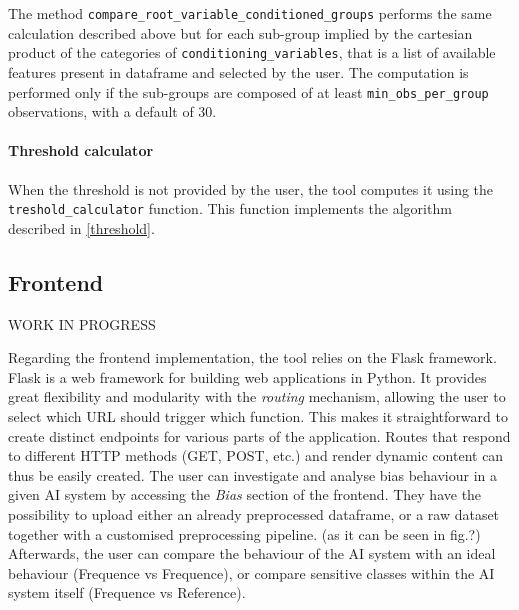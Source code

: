 \documentclass[
]{ceurart}
\begin{document}
The method \lstinline[columns=fixed]{compare_root_variable_conditioned_groups} performs the same calculation described above but for each sub-group implied by the cartesian product of the categories of \lstinline[columns=fixed]{conditioning_variables}, that is a list of available features present in dataframe and selected by the user. The computation is performed only if the sub-groups are composed of at least \lstinline[columns=fixed]{min_obs_per_group} observations, with a default of 30.

\paragraph{Threshold calculator}
When the threshold is not provided by the user, the tool computes it using the \lstinline[columns=fixed]{treshold_calculator} function. This function implements the algorithm described in \ref{threshold}.

\subsection{Frontend}
WORK IN PROGRESS

Regarding the frontend implementation, the tool relies on the Flask framework. Flask is a web framework for building web applications in Python. It provides great flexibility and modularity with the \textit{routing} mechanism, allowing the user to select which URL should trigger which function. This makes it straightforward to create distinct endpoints for various parts of the application. Routes that respond to different HTTP methods (GET, POST, etc.) and render dynamic content can thus be easily created.
The user can investigate and analyse bias behaviour in a given AI system by accessing the \textit{Bias} section of the frontend. They have the possibility to upload either an already preprocessed dataframe, or a raw dataset together with a customised preprocessing pipeline. (as it can be seen in fig.?) 
Afterwards, the user can compare the behaviour of the AI system with an ideal behaviour (Frequence vs Frequence), or compare sensitive classes within the AI system itself (Frequence vs Reference).
\end{document}
